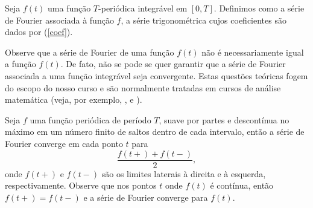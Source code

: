  \begin{defn} Seja $f(t)$ uma função $T$-periódica integrável em $[0,T]$. Definimos como a série de Fourier associada à função $f$, a série trigonométrica cujos coeficientes são dados por (\ref{coef}). 
 \end{defn}
Observe que a série de Fourier de uma função $f(t)$ não é necessariamente igual a função $f(t)$. De fato, não se pode se quer garantir que a série de Fourier associada a uma função integrável seja convergente. Estas questões teóricas fogem do escopo do nosso curso e são normalmente tratadas em cursos de análise matemática (veja, por exemplo, \cite{DAVIS}, \cite{TOLSTOV} e \cite{HSU}). 
\begin{teo}{\label{teo_Dirichlet}} Seja $f$ uma função periódica de período $T$, suave por partes e descontínua no máximo em um número finito de saltos dentro de cada intervalo, então a série de Fourier converge em cada ponto $t$ para
\begin{equation}
\frac{f(t+)+f(t-)}{2},
\end{equation}
onde $f(t+)$ e $f(t-)$ são os limites laterais à direita e à esquerda, respectivamente. Observe que nos pontos $t$ onde $f(t)$ é contínua, então $f(t+)=f(t-)$ e a série de Fourier converge para $f(t)$.
\end{teo}
